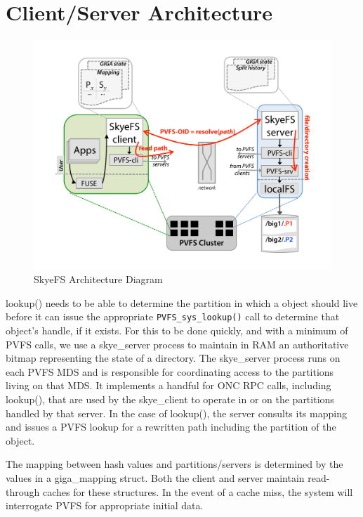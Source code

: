\documentclass[letterpaper]{article}
\newcommand{\code}[1]{\texttt{#1}}
\begin{document}
\section{Client/Server Architecture}
\begin{figure}
\begin{center}
\includegraphics[scale=0.4]{figure-architecture}
\end{center}
\caption{SkyeFS Architecture Diagram}
\end{figure}
lookup() needs to be able to determine the partition in which a object should
live before it can issue the appropriate \code{PVFS\_\-sys\_\-lookup()} call to determine
that object's handle, if it exists.  For this to be done quickly, and with a
minimum of PVFS calls, we use a skye\_\-server process to maintain in RAM an
authoritative bitmap representing the state of a directory.  The skye\_\-server
process runs on each PVFS MDS and is responsible for coordinating access to the
partitions living on that MDS.  It implements a handful for ONC RPC calls,
including lookup(), that are used by the skye\_\-client to operate in or on the
partitions handled by that server.  In the case of lookup(), the server consults
its mapping and issues a PVFS lookup for a rewritten path including the
partition of the object.

The mapping between hash values and partitions/servers is determined by the
values in a giga\_\-mapping struct.  Both the client and server maintain
read-through caches for these structures.  In the event of a cache miss, the
system will interrogate PVFS for appropriate initial data.
\end{document}
